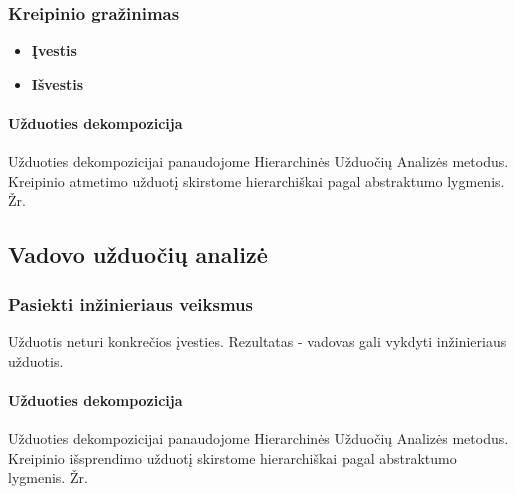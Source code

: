 	
	\subsubsection{Kreipinio gražinimas}	
	
		\begin{itemize}
			\item \textbf{Įvestis}
			\item \textbf{Išvestis} 
		\end{itemize}

	\paragraph{Užduoties dekompozicija} 

	Užduoties dekompozicijai panaudojome Hierarchinės Užduočių Analizės metodus.
	Kreipinio atmetimo užduotį skirstome hierarchiškai pagal abstraktumo lygmenis. 
	Žr. 
 		

\subsection{Vadovo užduočių analizė}

	\subsubsection{Pasiekti inžinieriaus veiksmus}

	Užduotis neturi konkrečios įvesties. 
	Rezultatas - vadovas gali vykdyti inžinieriaus užduotis.
		
	\paragraph{Užduoties dekompozicija}
	
	Užduoties dekompozicijai panaudojome Hierarchinės Užduočių Analizės metodus.
	Kreipinio išsprendimo užduotį skirstome hierarchiškai pagal abstraktumo lygmenis. 
	Žr. 
 		

